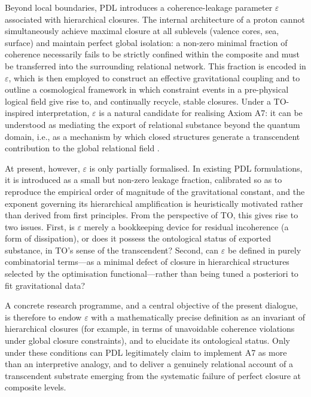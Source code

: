 \documentclass[11pt,a4paper]{article}
\begin{document}
Beyond local boundaries, PDL introduces a coherence-leakage parameter \(\varepsilon\) associated with hierarchical closures. The internal architecture of a proton cannot simultaneously achieve maximal closure at all sublevels (valence cores, sea, surface) and maintain perfect global isolation: a non-zero minimal fraction of coherence necessarily fails to be strictly confined within the composite and must be transferred into the surrounding relational network. This fraction is encoded in \(\varepsilon\), which is then employed to construct an effective gravitational coupling and to outline a cosmological framework in which constraint events in a pre-physical logical field give rise to, and continually recycle, stable closures. Under a TO-inspired interpretation, \(\varepsilon\) is a natural candidate for realising Axiom A7: it can be understood as mediating the export of relational substance beyond the quantum domain, i.e., as a mechanism by which closed structures generate a transcendent contribution to the global relational field \cite{Laubscher_PDL_long,Laubscher_LDP_fr}.

At present, however, \(\varepsilon\) is only partially formalised. In existing PDL formulations, it is introduced as a small but non-zero leakage fraction, calibrated so as to reproduce the empirical order of magnitude of the gravitational constant, and the exponent governing its hierarchical amplification is heuristically motivated rather than derived from first principles. From the perspective of TO, this gives rise to two issues. First, is \(\varepsilon\) merely a bookkeeping device for residual incoherence (a form of dissipation), or does it possess the ontological status of exported substance, in TO’s sense of the transcendent? Second, can \(\varepsilon\) be defined in purely combinatorial terms—as a minimal defect of closure in hierarchical structures selected by the optimisation functional—rather than being tuned a posteriori to fit gravitational data?  

A concrete research programme, and a central objective of the present dialogue, is therefore to endow \(\varepsilon\) with a mathematically precise definition as an invariant of hierarchical closures (for example, in terms of unavoidable coherence violations under global closure constraints), and to elucidate its ontological status. Only under these conditions can PDL legitimately claim to implement A7 as more than an interpretive analogy, and to deliver a genuinely relational account of a transcendent substrate emerging from the systematic failure of perfect closure at composite levels.
\end{document}
